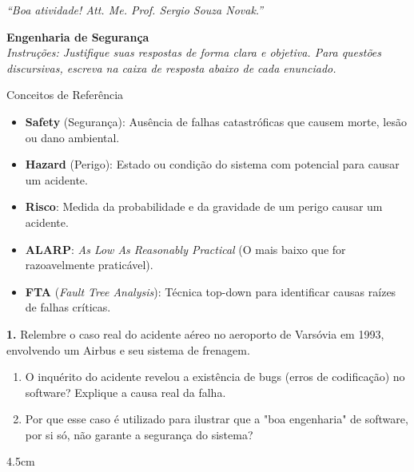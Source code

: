\documentclass[12pt,a4paper]{report}
\begin{document}
\vspace{0.8cm}

\begin{center}
  \textit{``Boa atividade! Att. Me. Prof. Sergio Souza Novak.''}
\end{center}

\vspace*{0.2cm}

\begin{center}
  {\Large \textbf{Engenharia de Segurança}}\\[0.2cm]
  \textit{Instruções: Justifique suas respostas de forma clara e objetiva.
  Para questões discursivas, escreva na caixa de resposta abaixo de cada enunciado.}
\end{center}

\vspace{0.4cm}

\begin{block}{Conceitos de Referência}
  \small
  \begin{itemize}
    \item \textbf{Safety} (Segurança): Ausência de falhas catastróficas que causem morte, lesão ou dano ambiental.
    \item \textbf{Hazard} (Perigo): Estado ou condição do sistema com potencial para causar um acidente.
    \item \textbf{Risco}: Medida da probabilidade e da gravidade de um perigo causar um acidente.
    \item \textbf{ALARP}: \textit{As Low As Reasonably Practical} (O mais baixo que for razoavelmente praticável).
    \item \textbf{FTA} (\textit{Fault Tree Analysis}): Técnica top-down para identificar causas raízes de falhas críticas.
  \end{itemize}
\end{block}

\vspace{0.5cm}

\textbf{1.} Relembre o caso real do acidente aéreo no aeroporto de Varsóvia em 1993, envolvendo um Airbus e seu sistema de frenagem.

\begin{enumerate}[label=\alph*)]
  \item O inquérito do acidente revelou a existência de bugs (erros de codificação) no software? Explique a causa real da falha.
  \item Por que esse caso é utilizado para ilustrar que a "boa engenharia" de software, por si só, não garante a segurança do sistema?
\end{enumerate}
\begin{resposta}{4.5cm}
\end{resposta}
\end{document}
